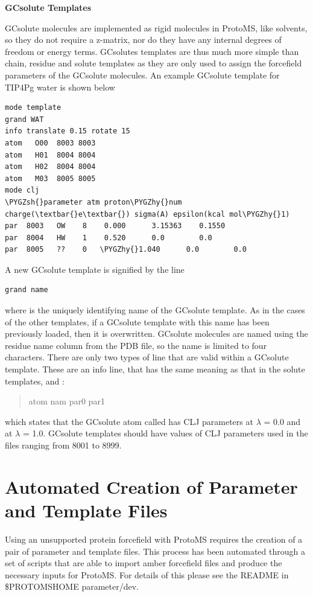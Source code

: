 \documentclass[letterpaper,10pt,english]{sphinxmanual}
\def\PYGZsh{\char`\#}
\def\PYGZhy{\char`\-}
\begin{document}
\textbf{GCsolute Templates}

GCsolute molecules are implemented as rigid molecules in ProtoMS, like solvents, so they do not require a z-matrix, nor do they have any internal degrees of freedom or energy terms. GCsolutes templates are thus much more simple than chain, residue and solute templates as they are only used to assign the forcefield parameters of the GCsolute molecules. An example GCsolute template for TIP4Pg water is shown below

\begin{Verbatim}[commandchars=\\\{\}]
mode template
grand WAT
info translate 0.15 rotate 15
atom   O00  8003 8003
atom   H01  8004 8004
atom   H02  8004 8004
atom   M03  8005 8005
mode clj
\PYGZsh{}parameter atm proton\PYGZhy{}num charge(\textbar{}e\textbar{}) sigma(A) epsilon(kcal mol\PYGZhy{}1)
par  8003   OW    8    0.000      3.15363    0.1550
par  8004   HW    1    0.520      0.0        0.0
par  8005   ??    0   \PYGZhy{}1.040      0.0        0.0
\end{Verbatim}

A new GCsolute template is signified by the line

\begin{Verbatim}[commandchars=\\\{\}]
grand name
\end{Verbatim}

where  is the uniquely identifying name of the GCsolute template. As in the cases of the other templates, if a GCsolute template with this name has been previously loaded, then it is overwritten. GCsolute molecules are named using the residue name column from the PDB file, so the name is limited to four characters. There are only two types of line that are valid within a GCsolute template. These are an info line, that has the same meaning as that in the solute templates, and :
\begin{quote}

atom nam par0 par1
\end{quote}

which states that the GCsolute atom called  has CLJ parameters  at \(\lambda\)  = 0.0 and  at \(\lambda\) = 1.0. GCsolute templates should have values of CLJ parameters used in the files ranging from 8001 to 8999.


\section{Automated Creation of Parameter and Template Files}
\label{protoms:automated-creation-of-parameter-and-template-files}
Using an unsupported protein forcefield with ProtoMS requires the creation of a pair of parameter and template files. This process has been automated through a set of scripts that are able to import amber forcefield files and produce the necessary inputs for ProtoMS. For details of this please see the README in \$PROTOMSHOME parameter/dev.
\end{document}
